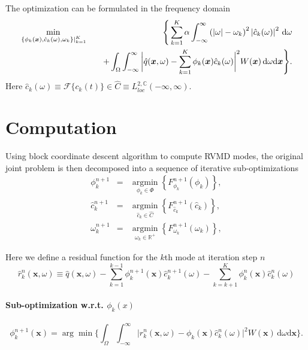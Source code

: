 \documentclass[12pt]{article}
\numberwithin{equation}{section}
\begin{document}
The optimization can be formulated in the frequency domain
\begin{eqnarray}
	\min_{\left.\left\{\phi_k(\boldsymbol{x}),\hat{c}_k(\omega),\omega_k\right\}\right|_{k=1}^K}&&
	\Bigg\{
	\sum_{k=1}^K \alpha\int_{-\infty}^\infty \left(|\omega|-\omega_k\right)^2 \left|\hat{c}_k(\omega)\right|^2\,\mathrm{d}\omega \notag\\
	&&\quad+\int_\Omega\int_{-\infty}^\infty \bigg|\hat{q}(\boldsymbol{x},\omega)-\sum_{k=1}^K\phi_k(\boldsymbol{x})\hat{c}_k(\omega)\bigg|^2 W(\bm{x})\,\mathrm{d}\omega\mathrm{d}\boldsymbol{x}
	\Bigg\}.
\end{eqnarray}
Here $\hat{c}_k(\omega)\equiv\mathcal{F}\{c_k(t)\}\in\hat{C}\equiv L_{loc}^{2,\mathbb{C}}(-\infty,\infty)$.

\section{Computation}

Using block coordinate descent algorithm to compute RVMD modes, the original joint problem is then decomposed into a sequence of iterative sub-optimizations
\begin{eqnarray}
	\phi_k^{n+1}&=&\underset{\phi_k\in\Phi}{\operatorname{argmin}}\left\{F_{\phi_k}^{n+1}(\phi_k)\right\}, \\
	\hat{c}_k^{n+1}&=&\underset{\hat{c}_k\in \hat{C}}{\operatorname{argmin}}\left\{F_{\hat{c}_k}^{n+1}(\hat{c}_k)\right\}, \\
	\omega_k^{n+1}&=&\underset{\omega_k\in\mathbb{R}^+}{\operatorname{argmin}}\left\{F_{\omega_k}^{n+1}(\omega_k)\right\},
	\label{eqn:update}
\end{eqnarray}

Here we define a residual function for the $k$th mode at iteration step $n$
\begin{equation}
	\hat{r}_k^n(\bm{x},\omega)\equiv\hat{q}(\bm{x},\omega)
	-\sum_{k=1}^{k-1}\phi^{n+1}_k(\boldsymbol{x})\hat{c}^{n+1}_k(\omega)
	-\sum_{k=k+1}^K\phi^{n}_k(\boldsymbol{x})\hat{c}^{n}_k(\omega)
\end{equation}

\paragraph{Sub-optimization w.r.t. $\phi_k(x)$}

\begin{equation}
	\phi_k^{n+1}(\boldsymbol{x})=\arg\min	\Bigg\{\int_\Omega\int_{-\infty}^\infty \bigg|\hat{r}_k^n(\boldsymbol{x},\omega)-\phi_k(\boldsymbol{x})\hat{c}_k^n(\omega)\bigg|^2 W(\bm{x})\,\mathrm{d}\omega\mathrm{d}\boldsymbol{x}
	\Bigg\}.
\end{equation}
\end{document}

